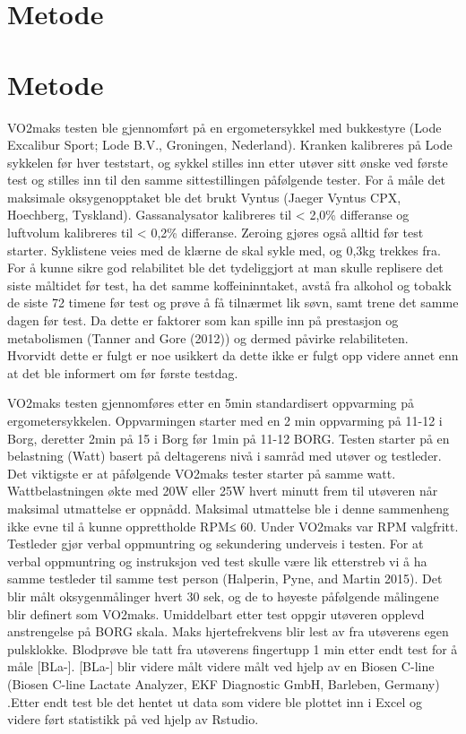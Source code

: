 \documentclass[
  letterpaper,
  DIV=11,
  numbers=noendperiod]{scrreprt}
\begin{document}
\section{Metode}\label{metode}

\section{Metode}\label{metode-1}

VO2maks testen ble gjennomført på en ergometersykkel med bukkestyre
(Lode Excalibur Sport; Lode B.V., Groningen, Nederland). Kranken
kalibreres på Lode sykkelen før hver teststart, og sykkel stilles inn
etter utøver sitt ønske ved første test og stilles inn til den samme
sittestillingen påfølgende tester. For å måle det maksimale
oksygenopptaket ble det brukt Vyntus (Jaeger Vyntus CPX, Hoechberg,
Tyskland). Gassanalysator kalibreres til \textless{} 2,0\% differanse og
luftvolum kalibreres til \textless{} 0,2\% differanse. Zeroing gjøres
også alltid før test starter. Syklistene veies med de klærne de skal
sykle med, og 0,3kg trekkes fra. For å kunne sikre god relabilitet ble
det tydeliggjort at man skulle replisere det siste måltidet før test, ha
det samme koffeininntaket, avstå fra alkohol og tobakk de siste 72
timene før test og prøve å få tilnærmet lik søvn, samt trene det samme
dagen før test. Da dette er faktorer som kan spille inn på prestasjon og
metabolismen (Tanner and Gore (2012)) og dermed påvirke relabiliteten.
Hvorvidt dette er fulgt er noe usikkert da dette ikke er fulgt opp
videre annet enn at det ble informert om før første testdag.

VO2maks testen gjennomføres etter en 5min standardisert oppvarming på
ergometersykkelen. Oppvarmingen starter med en 2 min oppvarming på 11-12
i Borg, deretter 2min på 15 i Borg før 1min på 11-12 BORG. Testen
starter på en belastning (Watt) basert på deltagerens nivå i samråd med
utøver og testleder. Det viktigste er at påfølgende VO2maks tester
starter på samme watt. Wattbelastningen økte med 20W eller 25W hvert
minutt frem til utøveren når maksimal utmattelse er oppnådd. Maksimal
utmattelse ble i denne sammenheng ikke evne til å kunne opprettholde
RPM≤ 60. Under VO2maks var RPM valgfritt. Testleder gjør verbal
oppmuntring og sekundering underveis i testen. For at verbal oppmuntring
og instruksjon ved test skulle være lik etterstreb vi å ha samme
testleder til samme test person (Halperin, Pyne, and Martin 2015). Det
blir målt oksygenmålinger hvert 30 sek, og de to høyeste påfølgende
målingene blir definert som VO2maks. Umiddelbart etter test oppgir
utøveren opplevd anstrengelse på BORG skala. Maks hjertefrekvens blir
lest av fra utøverens egen pulsklokke. Blodprøve ble tatt fra utøverens
fingertupp 1 min etter endt test for å måle {[}BLa-{]}. {[}BLa-{]} blir
videre målt videre målt ved hjelp av en Biosen C-line (Biosen C-line
Lactate Analyzer, EKF Diagnostic GmbH, Barleben, Germany) .Etter endt
test ble det hentet ut data som videre ble plottet inn i Excel og videre
ført statistikk på ved hjelp av Rstudio.
\end{document}
